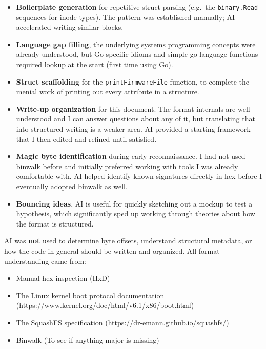 \documentclass[11pt,a4paper]{article}
\begin{document}
\begin{itemize}
    \item \textbf{Boilerplate generation} for repetitive struct parsing
        (e.g.\ the \texttt{binary.Read} sequences for inode types). The
        pattern was established manually; AI accelerated writing similar
        blocks.

    \item \textbf{Language gap filling}, the underlying systems
        programming concepts were already understood, but Go-specific
        idioms and simple go language functions required lookup at the start (first time using Go).

    \item \textbf{Struct scaffolding} for the \texttt{printFirmwareFile}
        function, to complete the menial work of printing out every attribute in a structure.
          
    \item \textbf{Write-up organization} for this document. The format
      	internals are well understood and I can answer questions about any
      	of it, but translating that into structured writing is a weaker
      	area. AI provided a starting framework that I then edited and
      	refined until satisfied.
    
    \item \textbf{Magic byte identification} during early reconnaissance.
      	I had not used binwalk before and initially preferred working with
      	tools I was already comfortable with. AI helped identify known
      	signatures directly in hex before I eventually adopted binwalk
      	as well.
    
	\item \textbf{Bouncing ideas}, AI is useful for quickly sketching
      out a mockup to test a hypothesis, which significantly sped up
      working through theories about how the format is structured.

\end{itemize}

AI was \textbf{not} used to determine byte
offsets, understand structural metadata, or how the code in general should be written and organized. All format understanding came
from:

\begin{itemize}
    \item Manual hex inspection (HxD)
    \item The Linux kernel boot protocol documentation
          (\url{https://www.kernel.org/doc/html/v6.1/x86/boot.html})
    \item The SquashFS specification
          (\url{https://dr-emann.github.io/squashfs/})
    \item Binwalk (To see if anything major is missing)
\end{itemize}
\end{document}
